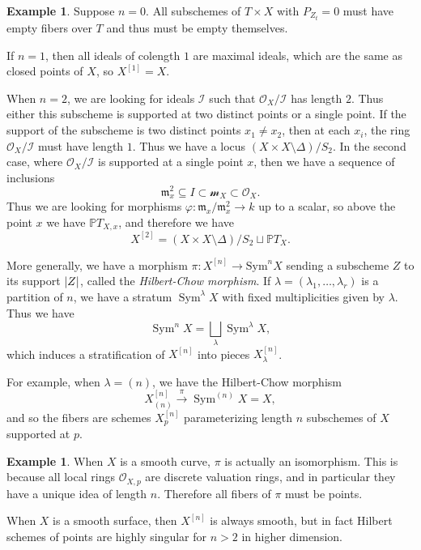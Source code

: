 \documentclass[leqno, openany]{memoir}
\theoremstyle{definition}
\newtheorem{exm}[thm]{Example}
\theoremstyle{remark}
\theoremstyle{plain}
\theoremstyle{definition}
\theoremstyle{remark}
\renewcommand{\P}{\mathbb{P}}
\newcommand{\mc}[1]{\mathcal{#1}}
\newcommand{\mf}[1]{\mathfrak{#1}}
\newcommand{\mr}[1]{\mathrm{#1}}
\DeclareMathOperator{\Sym}{Sym}
\begin{document}
\begin{exm}
    Suppose $n = 0$. All subschemes of $T \times X$ with $P_{Z_t} = 0$ must have empty fibers over $T$ and thus must be empty themselves.

    If $n = 1$, then all ideals of colength $1$ are maximal ideals, which are the same as closed points of $X$, so $X^{[1]} = X$.

    When $n = 2$, we are looking for ideals $\mc{I}$ such that $\mc{O}_X / \mc{I}$ has length $2$. Thus either this subscheme is supported at two distinct points or a single point. If the support of the subscheme is two distinct points $x_1 \neq x_2$, then at each $x_i$, the ring $\mc{O}_X/\mc{I}$ must have length $1$. Thus we have a locus $(X \times X \setminus \Delta) / S_2$. In the second case, where $\mc{O}_X / \mc{I}$ is supported at a single point $x$, then we have a sequence of inclusions
    \[ \mf{m}_x^2 \subseteq I \subset \mc{m}_X \subset \mc{O}_X. \]
    Thus we are looking for morphisms $\varphi \colon \mf{m}_x / \mf{m}_x^2 \to k$ up to a scalar, so above the point $x$ we have $\P T_{X,x}$, and therefore we have
    \[ X^{[2]} = (X \times X \setminus \Delta) / S_2 \sqcup \P T_X. \]
\end{exm}

More generally, we have a morphism $\pi \colon X^{[n]} \to \mr{Sym}^n X$ sending a subscheme $Z$ to its support $\abs{Z}$, called the \textit{Hilbert-Chow morphism}. If $\lambda = (\lambda_1, \ldots, \lambda_r)$ is a partition of $n$, we have a stratum $\Sym^{\lambda} X$ with fixed multiplicities given by $\lambda$. Thus we have
\[ \Sym^n X = \bigsqcup_{\lambda} \Sym^{\lambda} X, \]
which induces a stratification of $X^{[n]}$ into pieces $X_{\lambda}^{[n]}$.

For example, when $\lambda = (n)$, we have the Hilbert-Chow morphism
\[ X_{(n)}^{[n]} \xrightarrow{\pi} \Sym^{(n)} X = X, \]
and so the fibers are schemes $X_p^{[n]}$ parameterizing length $n$ subschemes of $X$ supported at $p$.

\begin{exm}
    When $X$ is a smooth curve, $\pi$ is actually an isomorphism. This is because all local rings $\mc{O}_{X,p}$ are discrete valuation rings, and in particular they have a unique idea of length $n$. Therefore all fibers of $\pi$ must be points.
\end{exm}

When $X$ is a smooth surface, then $X^{[n]}$ is always smooth, but in fact Hilbert schemes of points are highly singular for $n > 2$ in higher dimension.
\end{document}
